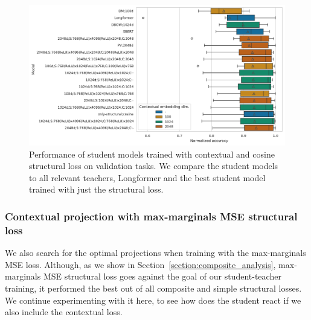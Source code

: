 \begin{figure}

  \includegraphics[width=\textwidth]{img/projections_contextual_cos.pdf}

  \caption{Performance of student models trained with contextual and cosine
  structural loss on validation tasks. We compare the student models to all
  relevant teachers, Longformer and the best student model trained with just
  the structural loss.}


  \label{fig:cos_projections_contextual}

\end{figure}

\subsubsection{Contextual projection with max-marginals MSE structural loss}

We also search for the optimal projections when training with the max-marginals
MSE loss. Although, as we show in Section~\ref{section:composite_analysis},
max-marginals MSE structural loss goes against the goal of our student-teacher
training, it performed the best out of all composite and simple structural
losses. We continue experimenting with it here, to see how does the student
react if we also include the contextual loss.

